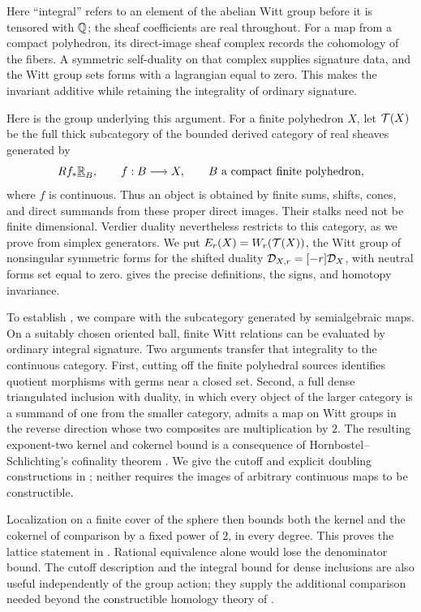 Here ``integral'' refers to an element of the abelian Witt group before
it is tensored with \(\mathbb Q\); the sheaf coefficients are real throughout.
For a map from a compact polyhedron, its direct-image sheaf complex
records the cohomology of the fibers. A symmetric self-duality on that
complex supplies signature data, and the Witt group sets forms with
a lagrangian equal to zero. This makes the invariant additive
while retaining the integrality of ordinary signature.

Here is the group underlying this argument. For a finite polyhedron \(X\), let
\(\mathcal T(X)\) be the full thick subcategory of the bounded derived category
of real sheaves generated by
\[
 Rf_*\underline{\mathbb R}_{B},\qquad f:B\longrightarrow X,
 \qquad B\text{ a compact finite polyhedron},
\]
where \(f\) is continuous. Thus an object is obtained by finite sums,
shifts, cones, and direct summands from these proper direct images.
Their stalks need not be finite dimensional. Verdier duality nevertheless
restricts to this category, as we prove from simplex generators.
We put \(E_r(X)=W_r(\mathcal T(X))\), the Witt group of nonsingular symmetric
forms for the shifted duality \(\mathcal D_{X,r}=[-r]\mathcal D_X\), with neutral forms
set equal to zero.  gives the precise definitions,
the signs, and homotopy invariance.

To establish , we compare with the subcategory
generated by semialgebraic maps. On a suitably chosen oriented ball,
finite Witt relations can be evaluated by ordinary integral signature. Two
arguments transfer that integrality to the continuous category.
First, cutting off the finite polyhedral sources identifies quotient
morphisms with germs near a closed set. Second, a full dense
triangulated inclusion with duality, in which every object of the larger
category is a summand of one from the smaller category, admits a map
on Witt groups in
the reverse direction whose two composites are multiplication by
\(2\). The resulting exponent-two kernel and cokernel bound is a
consequence of Hornbostel--Schlichting's cofinality theorem
\cite[author preprint, Appendix~A, Theorem~A.2]{HornbostelSchlichting2004}.
We give the cutoff and explicit doubling constructions in
; neither requires the images of arbitrary
continuous maps to be constructible.

Localization on a finite cover of the sphere then bounds both the
kernel and the cokernel of comparison by a fixed power of \(2\), in
every degree. This proves the lattice statement in
. Rational equivalence alone would lose the
denominator bound. The cutoff description and the integral bound for
dense inclusions are also useful independently of the group action;
they supply the additional comparison needed beyond the constructible
homology theory of \cite{Woolf2008}.

